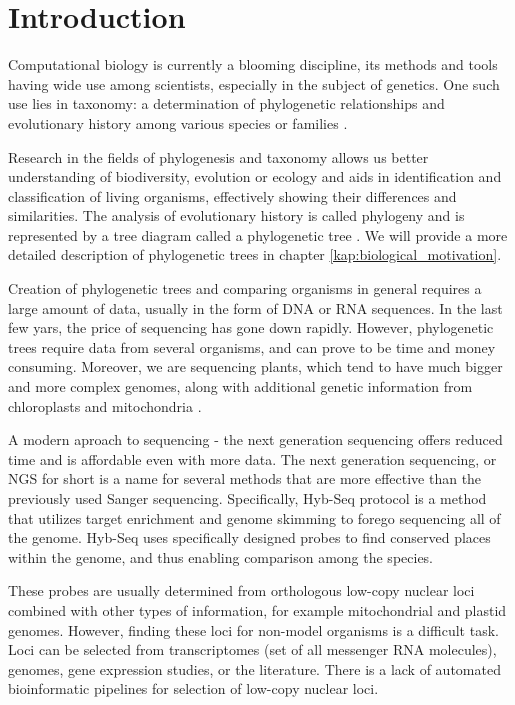 \chapter*{Introduction} %

Computational biology is currently a blooming discipline, its methods and tools having wide use 
among scientists, especially in the subject of genetics. One such use lies in taxonomy: a determination of 
phylogenetic relationships and evolutionary history among various species or families \cite{phylogenetics}. 

Research in the fields of phylogenesis and taxonomy allows us better understanding of biodiversity, evolution 
or ecology and aids in identification and classification of living organisms, effectively showing their differences 
and similarities. The analysis of evolutionary history is called phylogeny and is represented by a tree diagram 
called a phylogenetic tree \cite{phylogenetic_tree}. We will provide a more detailed description of phylogenetic 
trees in chapter \ref{kap:biological_motivation}. 

Creation of phylogenetic trees and comparing organisms in general requires a large amount of data, usually 
in the form of DNA or RNA sequences. In the last few yars, the price of sequencing has gone down rapidly. However, 
phylogenetic trees require data from several organisms, and can prove to be time and money consuming. Moreover, 
we are sequencing plants, which tend to have much bigger and more complex genomes, along with additional genetic 
information from chloroplasts and mitochondria \cite{schatz2012current}. 

A modern aproach to sequencing - the next generation sequencing offers reduced time and is affordable even with 
more data. The next generation sequencing, or NGS for short is a name for several methods that are more effective 
than the previously used Sanger sequencing. Specifically, Hyb-Seq protocol \cite{weitemier2014hyb} is a method 
that utilizes target enrichment and genome skimming to forego sequencing all of the genome. Hyb-Seq uses specifically 
designed probes to find conserved places within the genome, and thus enabling comparison among the species. 

These probes are usually determined from orthologous low-copy nuclear loci combined with other types of information, 
for example mitochondrial and plastid genomes. However, finding these loci for non-model organisms is a difficult task. 
Loci can be selected from transcriptomes (set of all messenger RNA molecules), genomes, gene expression studies, or the 
literature. There is a lack of automated bioinformatic pipelines for selection of low-copy nuclear loci.  

